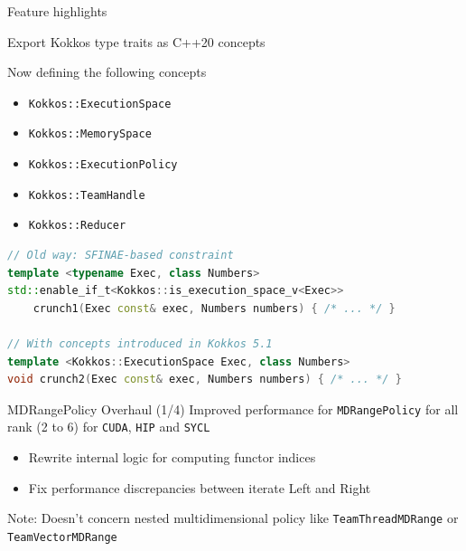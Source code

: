 
\begin{frame}[fragile]

  {\Huge Feature highlights}
  
  \vspace{10pt}

\end{frame}


\begin{frame}[fragile]{Export Kokkos type traits as C++20 concepts}

Now defining the following concepts
\begin{itemize}
\item \texttt{Kokkos::ExecutionSpace}
\item \texttt{Kokkos::MemorySpace}
\item \texttt{Kokkos::ExecutionPolicy}
\item \texttt{Kokkos::TeamHandle}
\item \texttt{Kokkos::Reducer}
\end{itemize}

\begin{lstlisting}[language=c++]
// Old way: SFINAE-based constraint
template <typename Exec, class Numbers>
std::enable_if_t<Kokkos::is_execution_space_v<Exec>>
    crunch1(Exec const& exec, Numbers numbers) { /* ... */ }

// With concepts introduced in Kokkos 5.1
template <Kokkos::ExecutionSpace Exec, class Numbers>
void crunch2(Exec const& exec, Numbers numbers) { /* ... */ }
\end{lstlisting}

\end{frame}


\begin{frame}[fragile]{MDRangePolicy Overhaul (1/4)}
  Improved performance for \texttt{MDRangePolicy} for all rank (2 to 6) for \texttt{CUDA}, \texttt{HIP} and \texttt{SYCL}
  \begin{itemize}
    \item Rewrite internal logic for computing functor indices
    \item Fix performance discrepancies between iterate Left and Right
  \end{itemize}

  \vspace{5pt}
  Note: Doesn't concern nested multidimensional policy like \texttt{TeamThreadMDRange} or \texttt{TeamVectorMDRange}
\end{frame}

